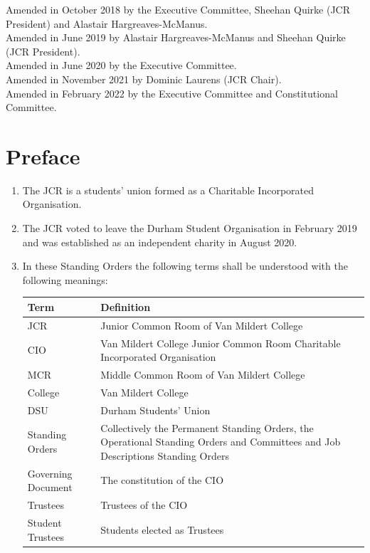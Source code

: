 \documentclass[12pt]{article}
\begin{document}
Amended in October 2018 by the Executive Committee, Sheehan Quirke (JCR President) and Alastair Hargreaves-McManus.\\
Amended in June 2019 by Alastair Hargreaves-McManus and Sheehan Quirke (JCR President).\\
Amended in June 2020 by the Executive Committee.\\
Amended in November 2021 by Dominic Laurens (JCR Chair).\\
Amended in February 2022 by the Executive Committee and Constitutional Committee.

\newpage
\tableofcontents{}
\newpage


\section{Preface}
\begin{enumerate}
    \item The JCR is a students' union formed as a Charitable Incorporated Organisation.
    \item The JCR voted to leave the Durham Student Organisation in February 2019 and was established as an independent charity in August 2020.
    \item In these Standing Orders the following terms shall be understood with the following meanings:\\
\begin{tabular}{|p{1.5in}|p{3.8in}|}\hline
    \textbf{Term}           & \textbf{Definition}\\ \hline
    JCR                     & Junior Common Room of Van Mildert College\\ \hline
    CIO						& Van Mildert College Junior Common Room  Charitable Incorporated Organisation\\\hline
    MCR                     & Middle Common Room of Van Mildert College\\\hline
    College                 & Van Mildert College\\ \hline
    DSU                     & Durham Students' Union\\ \hline
    Standing Orders         & Collectively the Permanent Standing Orders, the Operational Standing Orders and Committees and Job Descriptions Standing Orders \\ \hline
    Governing Document      & The constitution of the CIO\\\hline
    Trustees				& Trustees of the CIO\\\hline
    Student Trustees		& Students elected as Trustees\\\hline

\end{tabular}
\end{enumerate}
\end{document}
